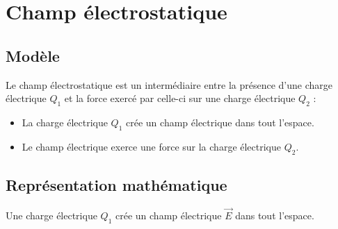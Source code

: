 
\section{Champ électrostatique}
%
\subsection{Modèle}
Le champ électrostatique est un intermédiaire entre la présence d'une charge électrique $Q_1$ et la force exercé par celle-ci sur une charge électrique $Q_2$ :

\begin{itemize}[leftmargin=2.3cm, label=, itemsep=5pt]
\item La charge électrique $Q_1$ crée un champ électrique dans tout l'espace.
\item Le champ électrique exerce une force sur la charge électrique $Q_2$.
\end{itemize}

\subsection{Représentation mathématique}
Une charge électrique $Q_1$ crée un champ électrique $\overrightarrow{E}$ dans tout l'espace. 


